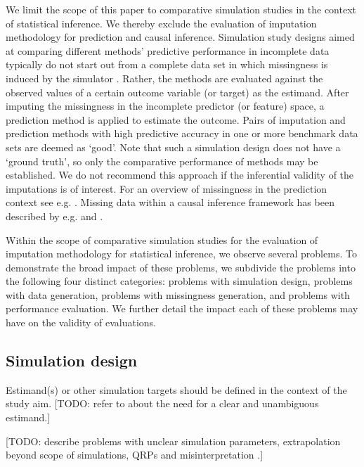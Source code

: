 \documentclass[bimj,fleqn]{w-art}
\begin{document}
We limit the scope of this paper to comparative simulation studies in the context of statistical inference. We thereby exclude the evaluation of imputation methodology for prediction and causal inference. Simulation study designs aimed at comparing different methods' predictive performance in incomplete data typically do not start out from a complete data set in which missingness is induced by the simulator \citep{liu21}. Rather, the methods are evaluated against the observed values of a certain outcome variable (or target) as the estimand. After imputing the missingness in the incomplete predictor (or feature) space, a prediction method is applied to estimate the outcome. Pairs of imputation and prediction methods with high predictive accuracy in one or more benchmark data sets are deemed as `good'. Note that such a simulation design does not have a `ground truth', so only the comparative performance of methods may be established. We do not recommend this approach if the inferential validity of the imputations is of interest. For an overview of missingness in the prediction context see e.g. \citet{sper20}. Missing data within a causal inference framework has been described by e.g. \cite{more18} and \cite{moha21}.

Within the scope of comparative simulation studies for the evaluation of imputation methodology for statistical inference, we observe several problems. To demonstrate the broad impact of these problems, we subdivide the problems into the following four distinct categories: problems with simulation design, problems with data generation, problems with missingness generation, and problems with performance evaluation. We further detail the impact each of these problems may have on the validity of evaluations. 



\subsection{Simulation design}


Estimand(s) or other simulation targets should be defined in the context of the study aim. [TODO: refer to \citet{pete14} about the need for a clear and unambiguous estimand.] 

[TODO: describe problems with unclear simulation parameters, extrapolation beyond scope of simulations, QRPs \citep{pawe22} and misinterpretation \citep[see "investigator bias"][]{gree17}.]
\end{document}
